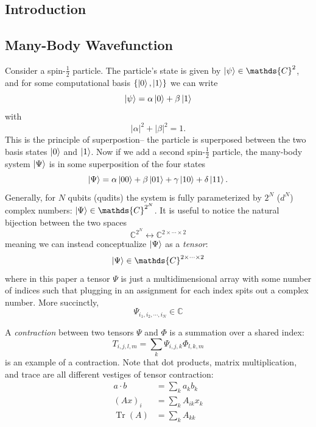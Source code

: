 \documentclass[12pt]{article}
\DeclareMathOperator{\Tr}{Tr}
\begin{document}
\begin{multicols}{2}

\section*{Introduction}
	\subsection*{Many-Body Wavefunction}
		Consider a spin-$\frac{1}{2}$ particle. The particle's state is given by $\ket{\psi}\in\mathds{C}^2$, and for some computational basis $\{\ket{0}, \ket{1}\}$ we can write
		$$\ket{\psi}=\alpha\ket{0}+\beta\ket{1}$$ with
		$$|\alpha|^2+|\beta|^2=1.$$ This is the principle of superpostion-- the particle is superposed between the two basis states $\ket{0}$ and $\ket{1}$. Now if we add a second spin-$\frac{1}{2}$ particle, the many-body system $\ket{\Psi}$ is in some superposition of the four states
		$$\ket{\Psi}=\alpha\ket{00}+\beta\ket{01}+\gamma\ket{10}+\delta\ket{11}.$$
		Generally, for $N$ qubits (qudits) the system is fully parameterized by $2^N$ ($d^N$) complex numbers: $\ket{\Psi}\in\mathds{C}^{2^N}$. It is useful to notice the natural bijection between the two spaces
		$$\mathds{C}^{2^N}\longleftrightarrow \mathds{C}^{2\times\cdots\times 2}$$
		meaning we can instead conceptualize $\ket{\Psi}$ as a \textit{tensor}:
		$$\ket{\Psi}\in\mathds{C}^{2\times\cdots\times2}$$
		where in this paper a tensor $\Psi$ is just a multidimensional array with some number of indices such that plugging in an assignment for each index spits out a complex number. More succinctly,
		$$\Psi_{i_1,i_2,\cdots,i_N}\in\mathds{C}$$

		A \textit{contraction} between two tensors $\Psi$ and $\Phi$ is a summation over a shared index:
		$$T_{i,j,l,m}=\sum_k\Psi_{i,j,k}\Phi_{l,k,m}$$
		is an example of a contraction. Note that dot products, matrix multiplication, and trace are all different vestiges of tensor contraction:
				\begin{align*}
				a\cdot b &=\sum_ka_kb_k\\
				(Ax)_{i} &=\sum_kA_{ik}x_k\\
				\Tr(A)&=\sum_kA_{kk}
			\end{align*}


\end{multicols}
\end{document}
